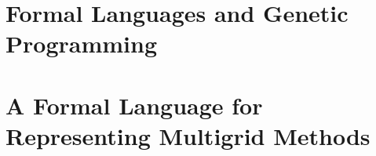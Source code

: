 \documentclass[
  paper = 17x24,
  language = english,
  acronym = split,
  acronymline = novertical,
  bibliography = false,
  bibliographypart = false,
  titlesize = Huge,
  par = halfskip,
]{faupress}
\theoremstyle{definition}
\begin{document}
\chapter{Formal Languages and Genetic Programming}
  
  
\chapter{A Formal Language for Representing Multigrid Methods}
  

\appendix 
  
    
\backmatter
  
  
\end{document}
